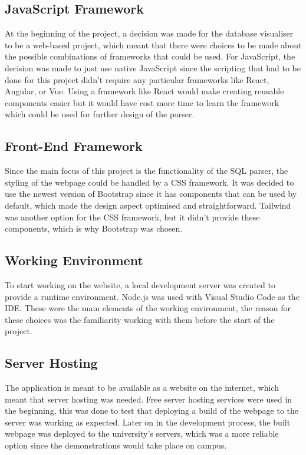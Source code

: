 \subsection{JavaScript Framework}

At the beginning of the project, a decision was made for the database visualiser to be a web-based project, which meant that there were choices to be made about the possible combinations of frameworks that could be used. For JavaScript, the decision was made to just use native JavaScript since the scripting that had to be done for this project didn't require any particular frameworks like React, Angular, or Vue. Using a framework like React would make creating reusable components easier but it would have cost more time to learn the framework which could be used for further design of the parser.

\subsection{Front-End Framework}

Since the main focus of this project is the functionality of the SQL parser, the styling of the webpage could be handled by a CSS framework. It was decided to use the newest version of Bootstrap \cite{Bootstrap} since it has components that can be used by default, which made the design aspect optimised and straightforward. Tailwind was another option for the CSS framework, but it didn't provide these components, which is why Bootstrap was chosen.

\subsection{Working Environment}

To start working on the website, a local development server was created to provide a runtime environment. Node.js was used with Visual Studio Code \cite{Code} as the IDE. These were the main elements of the working environment, the reason for these choices was the familiarity working with them before the start of the project.

\subsection{Server Hosting}

The application is meant to be available as a website on the internet, which meant that server hosting was needed. Free server hosting services\cite{Infinity} were used in the beginning, this was done to test that deploying a build of the webpage to the server was working as expected. Later on in the development process, the built webpage was deployed to the university's servers, which was a more reliable option since the demonstrations would take place on campus.

